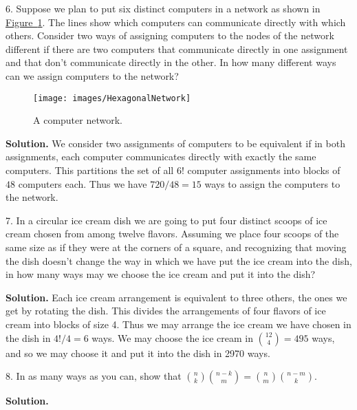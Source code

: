 \documentclass[10pt,]{book}
\theoremstyle{plain}
\theoremstyle{definition}
\theoremstyle{definition}
\numberwithin{equation}{chapter}
\begin{document}
\begin{exerciselist}
\item[6.]\hypertarget{exercise-6}{}Suppose we plan to put six distinct computers in a network as shown in \hyperref[hexagonalnetwork]{Figure~\ref{hexagonalnetwork}}.  The lines show which computers can communicate directly with which others.  Consider two ways of assigning computers to the nodes of the network different if there are two computers that communicate directly in one assignment and that don't communicate directly in the other.  In how many different ways can we assign computers to the network?%
\begin{figure}
\centering
\texttt{[image: images/HexagonalNetwork]}
\caption{A computer network.\label{hexagonalnetwork}}
\end{figure}
\par\smallskip
\par\smallskip
\noindent\textbf{Solution.}\hypertarget{solution-113}{}\quad
We consider two assignments of computers to be equivalent if in both assignments, each computer communicates directly with exactly the same computers. This partitions the set of all \(6!\) computer assignments into blocks of \(48\) computers each. Thus we have \(720/48=15\) ways to assign the computers to the network.%
\item[7.]\hypertarget{exercise-7}{}In a circular ice cream dish we are going to put four distinct scoops of ice cream chosen from among twelve flavors.  Assuming we place four scoops of the same size as if they were at the corners of a square, and recognizing that moving the dish doesn't change the way in which we have put the ice cream into the dish, in how many ways may we choose the ice cream and put it into the dish?%
\par\smallskip
\par\smallskip
\noindent\textbf{Solution.}\hypertarget{solution-114}{}\quad
Each ice cream arrangement is equivalent to three others, the ones we get by rotating the dish. This divides the arrangements of four flavors of ice cream into blocks of size 4. Thus we may arrange the ice cream we have chosen in the dish in \(4!/4=6\) ways. We may choose the ice cream in \(\binom{12}{4}=495\) ways, and so we may choose it and put it into the dish in 2970 ways.%
\item[8.]\hypertarget{exercise-8}{}In as many ways as you can, show that \(\binom{n}{k}\binom{n-k}{m} =
\binom{n}{m}\binom{n-m}{k}\).%
\par\smallskip
\par\smallskip
\noindent\textbf{Solution.}\hypertarget{solution-115}{}\quad

\end{exerciselist}
\end{document}
